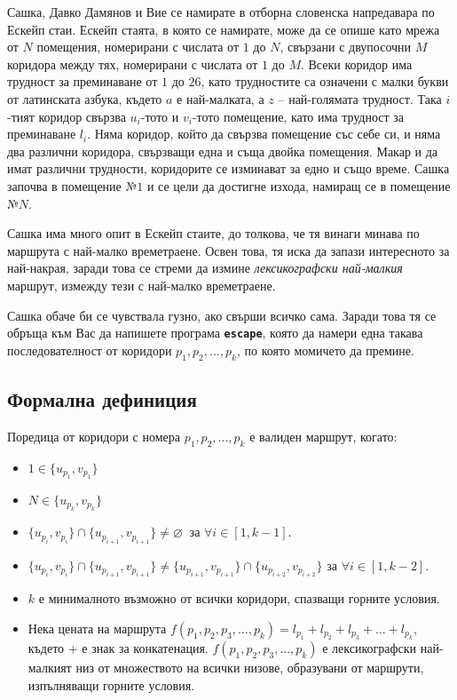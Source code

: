 \documentclass[12pt]{article}
\begin{document}
\newcommand{\tl}{$0.8$ сек.}
\newcommand{\ml}{$256$ MB}

Сашка, Давко Дамянов и Вие се намирате в отборна словенска напредавара по Ескейп стаи. Ескейп стаята, в която се намирате, може да се опише като мрежа от $N$ помещения, номерирани с числата от $1$ до $N$, свързани с двупосочни $M$ коридора между тях, номерирани с числата от $1$ до $M$. Всеки коридор има трудност за преминаване от $1$ до $26$, като трудностите са означени с малки букви от латинската азбука, където $a$ е най-малката, а $z$ -- най-голямата трудност. Така $i$-тият коридор свързва $u_i$-тото и $v_i$-тото помещение, като има трудност за преминаване $l_i$. Няма коридор, който да свързва помещение със себе си, и няма два различни коридора, свързващи една и съща двойка помещения. Макар и да имат различни трудности, коридорите се изминават за едно и също време. Сашка започва в помещение $№1$ и се цели да достигне изхода, намиращ се в помещение $№N$.

Сашка има много опит в Ескейп стаите, до толкова, че тя винаги минава по маршрута с най-малко времетраене. Освен това, тя иска да запази интересното за най-накрая, заради това се стреми да измине \textit{лексикографски най-малкия} маршрут, измежду тези с най-малко времетраене.

Сашка обаче би се чувствала гузно, ако свърши всичко сама. Заради това тя се обръща към Вас да напишете програма \textbf{\texttt{escape}}, която да намери една такава последователност от коридори $p_1,p_2,...,p_k$, по която момичето да премине.

\subsection{Формална дефиниция}
Поредица от коридори с номера $p_1,p_2,...,p_k$ е валиден маршрут, когато:

\begin{itemize}
    \setlength{\itemindent}{12pt}
    \item $1 \in \{u_{p_1}, v_{p_1}\}$
    \item $N \in \{u_{p_k}, v_{p_k}\}$
    \item $\{u_{p_i}, v_{p_i}\} \cap \{u_{p_{i+1}}, v_{p_{i+1}}\} \neq 	\varnothing\ $ за $ \forall i \in [1, k - 1]$.
    \item $\{u_{p_i}, v_{p_i}\} \cap \{u_{p_{i+1}}, v_{p_{i+1}}\} \neq 	\{u_{p_{i+1}}, v_{p_{i+1}}\} \cap \{u_{p_{i+2}}, v_{p_{i+2}}\}$ за $ \forall i \in [1, k - 2]$.
    \item $k$ е минималното възможно от всички коридори, спазващи горните условия.
    \item Нека цената на маршрута $f(p_1,p_2,p_3,...,p_k)=l_{p_1} + l_{p_2} + l_{p_3} + ... + l_{p_k}$, където $+$ е знак за конкатенация. $f(p_1,p_2,p_3,...,p_k)$ е лексикографски най-малкият низ от множеството на всички низове, образувани от маршрути, изпълняващи горните условия.
\end{itemize}
\end{document}
